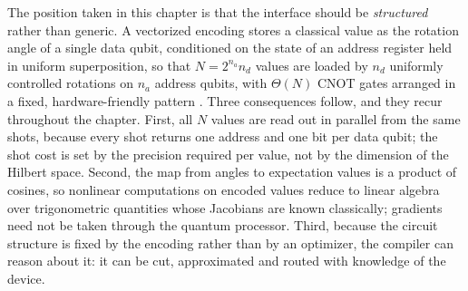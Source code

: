 The position taken in this chapter is that the interface should be \emph{structured} rather than generic. A vectorized encoding stores a classical value as the rotation angle of a single data qubit, conditioned on the state of an address register held in uniform superposition, so that $N = 2^{n_a} n_d$ values are loaded by $n_d$ uniformly controlled rotations on $n_a$ address qubits, with $\Theta(N)$ CNOT gates arranged in a fixed, hardware-friendly pattern \cite{mottonen2004ucr,balewski2024qcrank}. Three consequences follow, and they recur throughout the chapter. First, all $N$ values are read out in parallel from the same shots, because every shot returns one address and one bit per data qubit; the shot cost is set by the precision required per value, not by the dimension of the Hilbert space. Second, the map from angles to expectation values is a product of cosines, so nonlinear computations on encoded values reduce to linear algebra over trigonometric quantities whose Jacobians are known classically; gradients need not be taken through the quantum processor. Third, because the circuit structure is fixed by the encoding rather than by an optimizer, the compiler can reason about it: it can be cut, approximated and routed with knowledge of the device.

